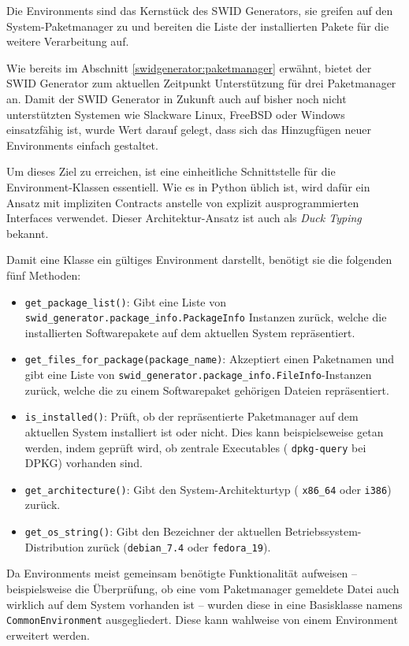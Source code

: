 Die Environments sind das Kernstück des SWID Generators, sie greifen auf
den System-Paketmanager zu und bereiten die Liste der installierten Pakete für
die weitere Verarbeitung auf.

Wie bereits im Abschnitt \ref{swidgenerator:paketmanager} erwähnt, bietet der
SWID Generator zum aktuellen Zeitpunkt Unterstützung für drei Paketmanager an.
Damit der SWID Generator in Zukunft auch auf bisher noch nicht unterstützten
Systemen wie Slackware Linux, FreeBSD oder Windows einsatzfähig ist, wurde Wert
darauf gelegt, dass sich das Hinzugfügen neuer Environments einfach gestaltet.

Um dieses Ziel zu erreichen, ist eine einheitliche Schnittstelle für die
Environment-Klassen essentiell. Wie es in Python üblich
ist\cite{contracts:2003}, wird dafür ein Ansatz mit impliziten Contracts
anstelle von explizit ausprogrammierten Interfaces verwendet. Dieser
Architektur-Ansatz ist auch als \textit{Duck Typing} bekannt.

Damit eine Klasse ein gültiges Environment darstellt, benötigt sie die folgenden
fünf Methoden:

\begin{itemize}
	\item \texttt{get\_package\_list()}: Gibt eine Liste von
		\texttt{swid\_generator.\-package\_info.\-PackageInfo} Instanzen zurück,
		welche die installierten Softwarepakete auf dem aktuellen System
		repräsentiert.
	\item \texttt{get\_files\_for\_package(package\_name)}: Akzeptiert einen
		Paketnamen und gibt eine Liste von
		\texttt{swid\_generator.\-package\_info.\-FileInfo}-Instanzen zurück, welche
		die zu einem Softwarepaket gehörigen Dateien repräsentiert.
	\item \texttt{is\_installed()}: Prüft, ob der repräsentierte Paketmanager auf
		dem aktuellen System installiert ist oder nicht. Dies kann beispielseweise
		getan werden, indem geprüft wird, ob zentrale Executables (\zb
		\texttt{dpkg-query} bei DPKG) vorhanden sind.
	\item \texttt{get\_architecture()}: Gibt den System-Architekturtyp (\zb
		\texttt{x86\_64} oder \texttt{i386}) zurück.
	\item \texttt{get\_os\_string()}: Gibt den Bezeichner der aktuellen
		Betriebssystem-Distribution zurück (\zb \texttt{debian\_7.4} oder
		\texttt{fedora\_19}).
\end{itemize}

Da Environments meist gemeinsam benötigte Funktionalität aufweisen --
beispielsweise die Überprüfung, ob eine vom Paketmanager gemeldete Datei auch
wirklich auf dem System vorhanden ist -- wurden diese in eine Basisklasse namens
\texttt{CommonEnvironment} ausgegliedert. Diese kann wahlweise von einem
Environment erweitert werden.

